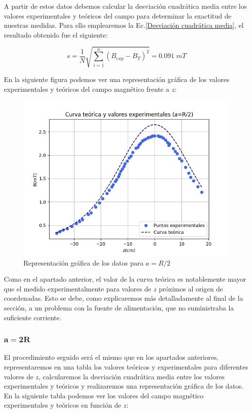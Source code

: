 \documentclass[a4paper,12pt,titlepage]{article}
\begin{document}
\newpage

A partir de estos datos debemos calcular la desviación cuadrática media entre los valores experimentales y teóricos del campo para determinar la exactitud de nuestras medidas. Para ello emplearemos la Ec.\ref{Desviación cuadrática media}, el resultado obtenido fue el siguiente:

\begin{equation}
    s = \frac{1}{N} \sqrt{\sum_{i=1}^{n} (B_{exp} - B_T)^2} = 0.091 \; mT
\end{equation}

En la siguiente figura podemos ver una representación gráfica de los valores experimentales y teóricos del campo magnético frente a $z$:

\begin{figure}[h!]
    \centering
    \includegraphics[width=0.85\linewidth]{Images/CurvaB2.png}
    \caption{Representación gráfica de los datos para $a=R/2$}
\end{figure}

Como en el apartado anterior, el valor de la curva teórica es notablemente mayor que el medido experimentalmente para valores de $z$ próximos al origen de coordenadas. Esto se debe, como explicaremos más detalladamente al final de la sección, a un problema con la fuente de alimentación, que no suministraba la suficiente corriente.

\subsubsection{$\mathbf{a=2R}$}

El procedimiento seguido será el mismo que en los apartados anteriores, representaremos en una tabla los valores teóricos y experimentales para diferentes valores de $z$, calcularemos la desviación cuadrática media entre los valores experimentales y teóricos y realizaremos una representación gráfica de los datos. En la siguiente tabla podemos ver los valores del campo magnético experimentales y teóricos en función de $z$:
\end{document}
